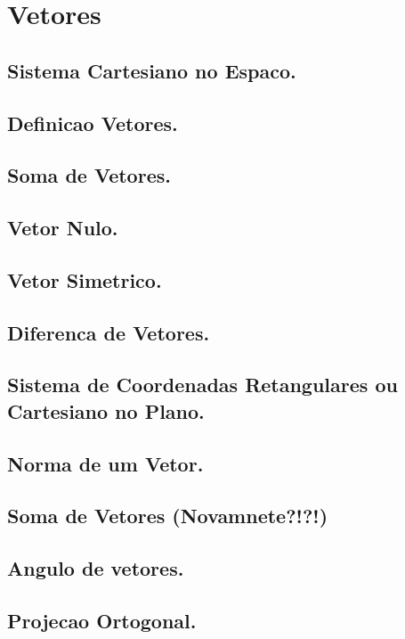 \documentclass[a4paper,12pt]{article}
\begin{document}
\section{Vetores}
\subsection{Sistema Cartesiano no Espaco.}

\subsection{Definicao Vetores.}

\subsection{Soma de Vetores.}

\subsection{Vetor Nulo.}

\subsection{Vetor Simetrico.}

\subsection{Diferenca de Vetores.}

\subsection{Sistema de Coordenadas Retangulares ou Cartesiano no Plano.}

\subsection{Norma de um Vetor.}

\subsection{Soma de Vetores (Novamnete?!?!)}

\subsection{Angulo de vetores.}

\subsection{Projecao Ortogonal.}
\end{document}
